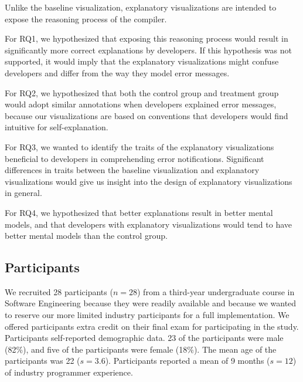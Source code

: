 \documentclass[conference]{IEEEtran}
\begin{document}
Unlike the baseline visualization, explanatory visualizations are intended to expose the reasoning process of the compiler. 

For RQ1, we hypothesized that exposing this reasoning process would result in significantly more correct explanations by developers. If this hypothesis was not supported, it would imply that the explanatory visualizations might confuse developers and differ from the way they model error messages.

For RQ2, we hypothesized that both the control group and treatment group would adopt similar annotations when developers explained error messages, because our visualizations are based on conventions that developers would find intuitive for self-explanation.

For RQ3, we wanted to identify the traits of the explanatory visualizations beneficial to developers in comprehending error notifications. Significant differences in traits between the baseline visualization and explanatory visualizations would give us insight into the design of explanatory visualizations in general.

For RQ4, we hypothesized that better explanations result in better mental models, and that developers with explanatory visualizations would tend to have better mental models than the control group.

\subsection{Participants}

We recruited 28 participants ($n = 28$) from a third-year undergraduate course in Software Engineering because they were readily available and because we wanted to reserve our more limited industry participants for a full implementation. We offered participants extra credit on their final exam for participating in the study. Participants self-reported demographic data. 23 of the participants were male (82\%), and five of the participants were female (18\%). The mean age of the participants was 22 ($s = 3.6$). Participants reported a mean of 9 months ($s = 12$) of industry programmer experience.

\end{document}

